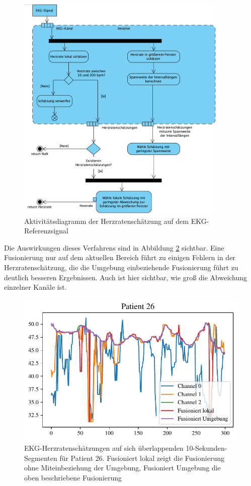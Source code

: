 	\begin{figure}[H]
		\centering
		\includegraphics[width=0.9\textwidth]{pic/ecg-hr-estimation.png}
		\caption[Aktivitätsdiagramm der Herzratenschätzung auf dem EKG-Referenzsignal]{Aktivitätsdiagramm der Herzratenschätzung auf dem EKG-Referenzsignal}
		\label{fig:ecg-hr-estimation}
	\end{figure}

	
	Die Auswirkungen dieses Verfahrens sind in Abbildung \ref{fig:ecg-patient-26} sichtbar. Eine Fusionierung nur auf dem aktuellen Bereich führt zu einigen Fehlern in der Herzratenschätzung, die die Umgebung einbeziehende Fusionierung führt zu deutlich besseren Ergebnissen. Auch ist hier sichtbar, wie groß die Abweichung einzelner Kanäle ist.

	\begin{figure}[H]
		\centering
		\includegraphics{pic/ecg-patient-26.pdf}
		\caption[\ac{EKG}-Herzratenschätzungen auf sich überlappenden 10-Sekunden-Segmenten für Patient 26]{\ac{EKG}-Herzratenschätzungen auf sich überlappenden 10-Sekunden-Segmenten für Patient 26. Fusioniert lokal zeigt die Fusionierung ohne Miteinbeziehung der Umgebung, Fusioniert Umgebung die oben beschriebene Fusionierung}
		\label{fig:ecg-patient-26}
	\end{figure}


